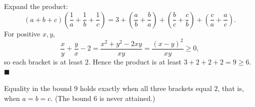 Expand the product:
\[
(a+b+c)\left(\dfrac{1}{a}+\dfrac{1}{b}+\dfrac{1}{c}\right)=3+\left(\dfrac {a}{b}+\dfrac {b}{a}\right)+\left(\dfrac {b}{c}+\dfrac {c}{b}\right)+\left(\dfrac {c}{a}+\dfrac {a}{c}\right).
\]
For positive $x,y$,
\[
\dfrac {x}{y}+\dfrac {y}{x}-2=\dfrac{x^2+y^2-2xy}{xy}=\dfrac{(x-y)^2}{xy}\ge0 ,
\]
so each bracket is at least $2$. Hence the product is at least $3+2+2+2=9\ge6$. $\blacksquare$

Equality in the bound $9$ holds exactly when all three brackets equal $2$, that is, when $a=b=c$. (The bound $6$ is never attained.)
